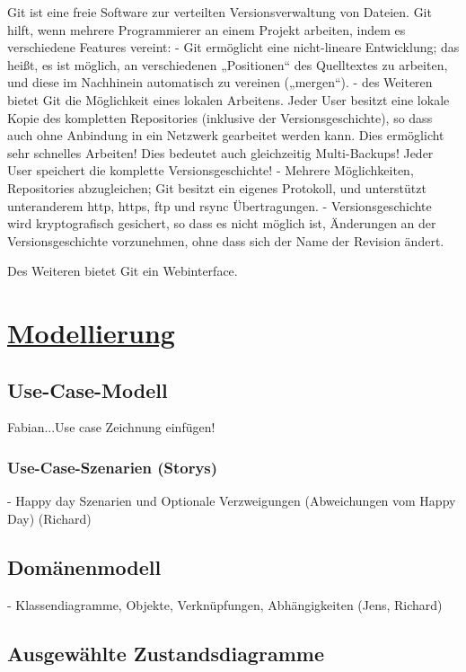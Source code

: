 \documentclass[a4paper]{article}
\begin{document}
Git ist eine freie Software zur verteilten Versionsverwaltung von Dateien. 
Git hilft, wenn mehrere Programmierer an einem Projekt arbeiten, indem es verschiedene Features vereint:
-	Git ermöglicht eine nicht-lineare Entwicklung; das heißt, es ist möglich, an verschiedenen „Positionen“ des Quelltextes zu arbeiten, und diese im Nachhinein automatisch zu vereinen („mergen“).
-	des Weiteren bietet Git die Möglichkeit eines lokalen Arbeitens. Jeder User besitzt eine lokale Kopie des kompletten Repositories (inklusive der Versionsgeschichte), so dass auch ohne Anbindung in ein Netzwerk gearbeitet werden kann. Dies ermöglicht sehr schnelles Arbeiten!
Dies bedeutet auch gleichzeitig Multi-Backups! Jeder User speichert die komplette Versionsgeschichte!
-	Mehrere Möglichkeiten, Repositories abzugleichen; Git besitzt ein eigenes Protokoll, und unterstützt unteranderem http, https, ftp und rsync Übertragungen.
-	Versionsgeschichte wird kryptografisch gesichert, so dass es nicht möglich ist, Änderungen an der Versionsgeschichte vorzunehmen, ohne dass sich der Name der Revision ändert.

Des Weiteren bietet Git ein Webinterface.

\section{\underline{Modellierung}}

\subsection{Use-Case-Modell}

	Fabian...Use case Zeichnung einfügen!
	
\subsubsection{Use-Case-Szenarien (Storys)}

	- Happy day Szenarien und Optionale Verzweigungen (Abweichungen vom Happy Day) (Richard)

\subsection{Domänenmodell}

	  - Klassendiagramme, Objekte, Verknüpfungen, Abhängigkeiten (Jens, Richard)
	
\subsection{Ausgewählte Zustandsdiagramme}
\end{document}
